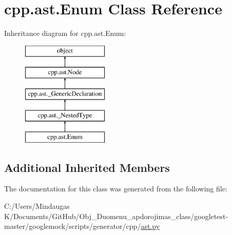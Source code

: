 \hypertarget{classcpp_1_1ast_1_1_enum}{}\section{cpp.\+ast.\+Enum Class Reference}
\label{classcpp_1_1ast_1_1_enum}
Inheritance diagram for cpp.\+ast.\+Enum\+:\begin{figure}[H]
\begin{center}
\leavevmode
\includegraphics[height=5.000000cm]{d4/d04/classcpp_1_1ast_1_1_enum}
\end{center}
\end{figure}
\subsection*{Additional Inherited Members}


The documentation for this class was generated from the following file\+:\begin{DoxyCompactItemize}
\item 
C\+:/\+Users/\+Mindaugas K/\+Documents/\+Git\+Hub/\+Obj\+\_\+\+Duomenu\+\_\+apdorojimas\+\_\+class/googletest-\/master/googlemock/scripts/generator/cpp/\mbox{\hyperlink{googletest-master_2googlemock_2scripts_2generator_2cpp_2ast_8py}{ast.\+py}}\end{DoxyCompactItemize}
